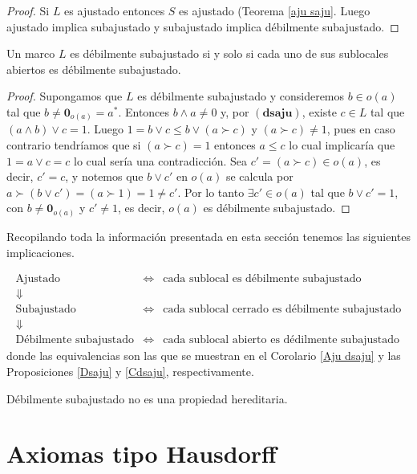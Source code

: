 \begin{proof}
    Si $L$ es ajustado entonces $S$ es ajustado (Teorema \ref{aju saju}. Luego ajustado implica subajustado y subajustado implica débilmente subajustado.
\end{proof}

\begin{prop}\label{Cdsaju}
    Un marco $L$ es débilmente subajustado si y solo si  cada uno de sus sublocales abiertos es débilmente subajustado.
\end{prop}

\begin{proof}
    Supongamos que $L$ es débilmente subajustado y consideremos $b\in o(a)$ tal que $b\neq \mathbf{0}_{o(a)}=a^*$. Entonces $b\wedge a\neq 0$ y, por $(\mathbf{dsaju})$, existe $c\in L$ tal que $(a\wedge b)\vee c=1$. Luego $1=b\vee c\leq b\vee (a\succ c)$ y $(a\succ c)\neq 1$, pues en caso contrario tendríamos que si $(a\succ c)=1$ entonces $a\leq c$ lo cual implicaría que $1=a\vee c=c$ lo cual sería una contradicción. Sea $c'=(a\succ c)\in o(a)$, es decir, $c'=c$, y notemos que $b\vee c'$ en $o(a)$ se calcula por $a\succ (b\vee c')=(a\succ 1)=1\neq c'$. Por lo tanto $\exists c'\in o(a)$ tal que $b\vee c'=1$, con $b\neq \mathbf{0}_{o(a)}$ y $c'\neq 1$, es decir, $o(a)$ es débilmente subajustado.
\end{proof}

Recopilando toda la información presentada en esta sección tenemos las siguientes implicaciones.

\[
\begin{array}{ccl}
   \mbox{Ajustado}  & \Longleftrightarrow & \mbox{cada sublocal es débilmente subajustado}  \\
    \Downarrow &  & \\
   \mbox{Subajustado}  & \Longleftrightarrow & \mbox{cada sublocal cerrado es débilmente subajustado}  \\
    \Downarrow &  & \\
   \mbox{Débilmente subajustado}  & \Longleftrightarrow & \mbox{cada sublocal abierto es dédilmente subajustado}  
\end{array}
\]
donde las equivalencias son las que se muestran en el Corolario \ref{Aju dsaju} y las Proposiciones \ref{Dsaju} y \ref{Cdsaju}, respectivamente.

\begin{cor}
    Débilmente subajustado no es una propiedad hereditaria.
\end{cor}

\section{Axiomas tipo Hausdorff}

